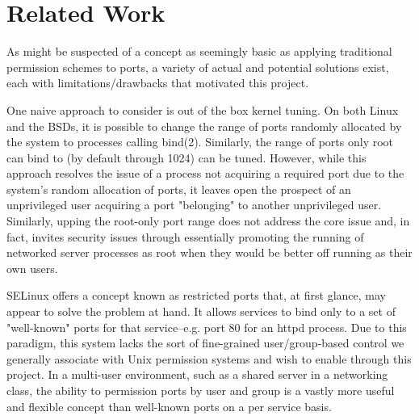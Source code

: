\documentclass{sig-alternate}
\begin{document}
\section{Related Work}
As might be suspected of a concept as seemingly basic as applying traditional permission schemes to ports, a variety of actual and potential solutions exist, each with limitations/drawbacks that motivated this project. 

	One naive approach to consider is out of the box kernel tuning. On both Linux and the BSDs, it is possible to change the range of ports randomly allocated by the system to processes calling bind(2). Similarly, the range of ports only root can bind to (by default through 1024) can be tuned. However, while this approach resolves the issue of a process not acquiring a required port due to the system's random allocation of ports, it leaves open the prospect of an unprivileged user acquiring a port "belonging" to another unprivileged user. Similarly, upping the root-only port range does not address the core issue and, in fact, invites security issues through essentially promoting the running of networked server processes as root when they would be better off running as their own users.
	
	SELinux offers a concept known as restricted ports that, at first glance, may appear to solve the problem at hand. It allows services to bind only to a set of "well-known" ports for that service--e.g. port 80 for an httpd process. Due to this paradigm, this system lacks the sort of fine-grained user/group-based control we generally associate with Unix permission systems and wish to enable through this project. In a multi-user environment, such as a shared server in a networking class, the ability to permission ports by user and group is a vastly more useful and flexible concept than well-known ports on a per service basis. 
	
\end{document}
